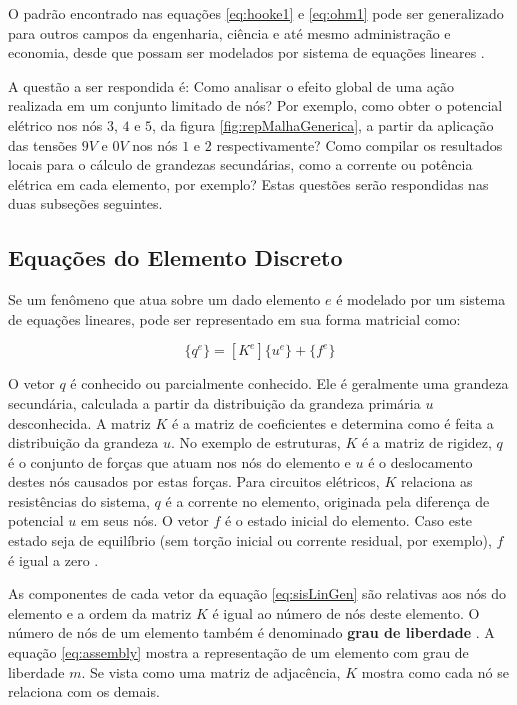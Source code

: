 \documentclass[
    12pt,               %
    openright,          %
    oneside,
    a4paper,            %
    english,            %
    french,             %
    spanish,            %
    brazil              %
    ]{abntex2}
\begin{document}
O padrão encontrado nas equações \ref{eq:hooke1} e \ref{eq:ohm1} pode ser generalizado para outros campos da engenharia, ciência e até mesmo administração e economia, desde que possam ser modelados por sistema de equações lineares \cite[p. 331]{burdenFaires}.

A questão a ser respondida é: Como analisar o efeito global de uma ação realizada em um conjunto limitado de nós? Por exemplo, como obter o potencial elétrico nos nós $3$, $4$ e $5$, da figura \ref{fig:repMalhaGenerica}, a partir da aplicação das tensões $9V$ e $0V$ nos nós $1$ e $2$ respectivamente? Como compilar os resultados locais  para o cálculo de grandezas secundárias, como a corrente ou potência elétrica em cada elemento, por exemplo? Estas questões serão respondidas nas duas subseções seguintes.


\subsection{Equações do Elemento Discreto}

Se um fenômeno que atua sobre um dado elemento $e$ é modelado por um sistema de equações lineares,  pode ser representado em sua forma matricial como:

 \begin{equation}
 \label{eq:sisLinGen}
    \{q^e\} = [K^e] \{u^e\} + \{f^e\}
 \end{equation}
 
O vetor $q$ é conhecido ou parcialmente conhecido. Ele é geralmente uma grandeza secundária, calculada a partir da distribuição da grandeza primária $u$ desconhecida. A matriz $K$ é a matriz de coeficientes e determina como é feita a distribuição da grandeza $u$. No exemplo de estruturas, $K$ é a matriz de rigidez, $q$ é o conjunto de forças que atuam nos nós do elemento e $u$ é o deslocamento destes nós causados por estas forças. Para circuitos elétricos, $K$ relaciona as resistências do sistema, $q$ é a corrente no elemento, originada pela diferença de potencial $u$ em seus nós. O vetor $f$ é o estado inicial do elemento. Caso este estado seja de equilíbrio (sem torção inicial ou corrente residual, por exemplo), $f$ é igual a zero \cite[p. 7]{zien}.

As componentes de cada vetor da equação \ref{eq:sisLinGen} são relativas aos nós do elemento e a ordem da matriz $K$ é igual ao número de nós deste elemento. O número de nós de um elemento também é denominado \textbf{grau de liberdade} \cite[p. 5]{zien}. A equação \ref{eq:assembly} mostra a representação de um elemento com grau de liberdade  $m$. Se vista como uma matriz de adjacência, $K$ mostra como cada nó se relaciona com os demais. 
 
\end{document}
